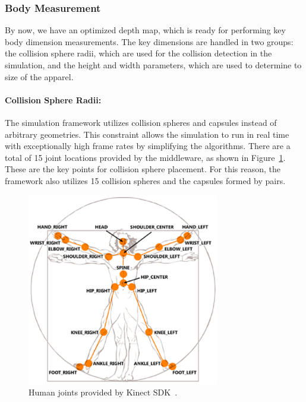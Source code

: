 \documentclass[number,preprint,review,12pt]{elsarticle}
\begin{document}
\doublespacing

\subsubsection{Body Measurement}
\label{subsubsec:4.2} 

By now, we have an optimized depth map, which is ready for performing key body dimension measurements. The key dimensions are handled in two groups:
 the collision sphere radii, which are used for the collision detection in the simulation, and the height and width parameters, which are used to determine to size of the apparel. 

\paragraph{Collision Sphere Radii:}

The simulation framework utilizes collision spheres and capsules instead of arbitrary geometries. This constraint allows the simulation to run in real time with exceptionally high frame rates by simplifying the algorithms. There are a total of 15 joint locations provided by the middleware, as shown in Figure~\ref{fig:nite_joints}. These are the key points for collision sphere placement. For this reason, the framework also utilizes 15 collision spheres and the capsules formed by pairs.

\begin{figure}[htbp]
	\begin{center}
	\includegraphics[width=0.75\textwidth]{nite_joints.eps}
	\end{center}
	\caption{Human joints provided by Kinect SDK~\cite{CodeProject2011}.}
	\label{fig:nite_joints}
\end{figure}
\end{document}
